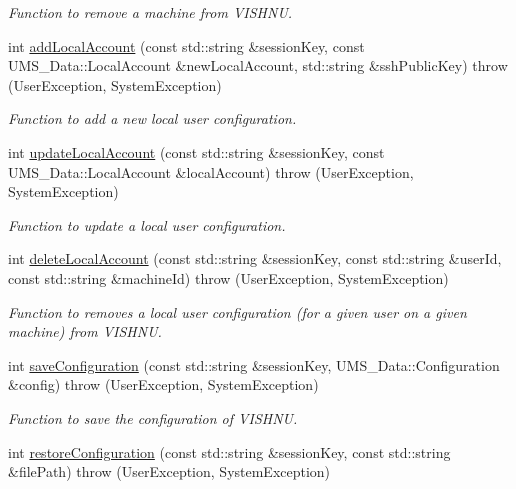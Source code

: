 \begin{DoxyCompactItemize}
\begin{DoxyCompactList}\small\item\em Function to remove a machine from VISHNU. \item\end{DoxyCompactList}\item 
int \hyperlink{namespacevishnu_ab54431ee8c1616ae24b071e9146d39e9}{addLocalAccount} (const std::string \&sessionKey, const UMS\_\-Data::LocalAccount \&newLocalAccount, std::string \&sshPublicKey)  throw (UserException, SystemException)
\begin{DoxyCompactList}\small\item\em Function to add a new local user configuration. \item\end{DoxyCompactList}\item 
int \hyperlink{namespacevishnu_ac51341ab58c1ed606b254262fbc053dc}{updateLocalAccount} (const std::string \&sessionKey, const UMS\_\-Data::LocalAccount \&localAccount)  throw (UserException, SystemException)
\begin{DoxyCompactList}\small\item\em Function to update a local user configuration. \item\end{DoxyCompactList}\item 
int \hyperlink{namespacevishnu_a2b51028779571b21c45a2a75cd362c59}{deleteLocalAccount} (const std::string \&sessionKey, const std::string \&userId, const std::string \&machineId)  throw (UserException, SystemException)
\begin{DoxyCompactList}\small\item\em Function to removes a local user configuration (for a given user on a given machine) from VISHNU. \item\end{DoxyCompactList}\item 
int \hyperlink{namespacevishnu_a2ecc54aee4da202b1caa94dfa6a43d17}{saveConfiguration} (const std::string \&sessionKey, UMS\_\-Data::Configuration \&config)  throw (UserException, SystemException)
\begin{DoxyCompactList}\small\item\em Function to save the configuration of VISHNU. \item\end{DoxyCompactList}\item 
int \hyperlink{namespacevishnu_a60ecb3b47532d0df7b0d44fdf43f98f4}{restoreConfiguration} (const std::string \&sessionKey, const std::string \&filePath)  throw (UserException, SystemException)

\end{DoxyCompactItemize}
